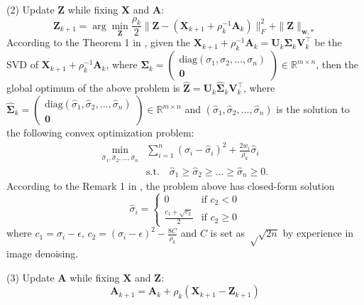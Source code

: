 \documentclass[10pt,twocolumn,letterpaper]{article}
\begin{document}
(2) Update $\mathbf{Z}$ while fixing $\mathbf{X}$ and $\mathbf{A}$:
\begin{equation}
\mathbf{Z}_{k+1}
=
\arg\min_{\mathbf{Z}}\frac{\rho_{k}}{2}
\|\mathbf{Z} - (\mathbf{X}_{k+1}+\rho_{k}^{-1}\mathbf{A}_{k})\|_{F}^{2}
+
\|\mathbf{Z}\|_{\bm{w},*}
\end{equation}
According to the Theorem 1 in \cite{wnnmijcv}, given the $\mathbf{X}_{k+1}+\rho_{k}^{-1}\mathbf{A}_{k}=\mathbf{U}_{k}\mathbf{\Sigma}_{k}\mathbf{V}_{k}^{\top}$ be the SVD of $\mathbf{X}_{k+1}+\rho_{k}^{-1}\mathbf{A}_{k}$, where $\mathbf{\Sigma}_{k}=
\left( \begin{array}{c}
\text{diag}(\sigma_{1},\sigma_{2},...,\sigma_{n})
\\
\mathbf{0}
\end{array} \right)
\in\mathbb{R}^{m\times n}$,
then the global optimum of the above problem is 
$\hat{\mathbf{Z}}=\mathbf{U}_{k}\hat{\mathbf{\Sigma}}_{k}\mathbf{V}_{k}^{\top}$, where 
$\hat{\mathbf{\Sigma}}_{k}=
\left( \begin{array}{c}
\text{diag}(\hat{\sigma}_{1},\hat{\sigma}_{2},...,\hat{\sigma}_{n})
\\
\mathbf{0}
\end{array} \right)
\in\mathbb{R}^{m\times n}$
and $(\hat{\sigma}_{1},\hat{\sigma}_{2},...,\hat{\sigma}_{n})$ is the solution to the following convex optimization problem:
\begin{equation}
\begin{split}
\min_{\hat{\sigma}_{1},\hat{\sigma}_{2},...,\hat{\sigma}_{n}}
&
\sum_{i=1}^{n}
(\sigma_{i}-\hat{\sigma}_{i})^{2}
+
\frac{2w_{i}}{\rho_{k}}\hat{\sigma}_{i}
\\
&
\text{s.t.}
\quad
\hat{\sigma}_{1}\ge \hat{\sigma}_{2} \ge...\ge \hat{\sigma}_{n}\ge 0.
\end{split}
\end{equation}
According to the Remark 1 in \cite{wnnmijcv}, the problem above has closed-form solution
\begin{equation}
\hat{\sigma}_{i}
=
\left\{ \begin{array}{ll}
0 & \textrm{if $c_{2}<0$}\\
\frac{c_{1}+\sqrt{c_{2}}}{2} & \textrm{if $c_{2}\ge 0$}
\end{array} \right.
\end{equation}
where $c_{1}=\sigma_{i}-\epsilon$, $c_{2} = (\sigma_{i}-\epsilon)^{2}-\frac{8C}{\rho_{k}}$ and $C$ is set as $√
\sqrt{2n}$ by experience in image denoising.
 
(3) Update $\mathbf{A}$ while fixing $\mathbf{X}$ and $\mathbf{Z}$:
\begin{equation}\label{e14}
\mathbf{A}_{k+1}
=
\mathbf{A}_{k} + \rho_{k}(\mathbf{X}_{k+1}-\mathbf{Z}_{k+1})
\end{equation}
\end{document}
